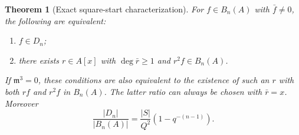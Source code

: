 \documentclass[11pt]{article}
\newtheorem{theorem}{Theorem}[section]
\theoremstyle{remark}\newtheorem{remark}[theorem]{Remark}
\newcommand{\m}{\mathfrak m}
\begin{document}
\begin{theorem}[Exact square-start characterization]\label{thm:exact}
For $f\in B_n(A)$ with $\bar f\ne0$, the following are equivalent:
\begin{enumerate}
\item $f\in D_n$;
\item there exists $r\in A[x]$ with $\deg\bar r\ge1$ and $r^2f\in B_n(A)$.
\end{enumerate}
If $\m^3=0$, these conditions are also equivalent to the existence of such an $r$ with both $rf$ and $r^2f$ in $B_n(A)$. The latter ratio can always be chosen with $\bar r=x$. Moreover
\begin{equation}\label{eq:count}
 \frac{|D_n|}{|B_n(A)|}=\frac{|S|}{Q^2}\left(1-q^{-(n-1)}\right).
\end{equation}
\end{theorem}
\end{document}
